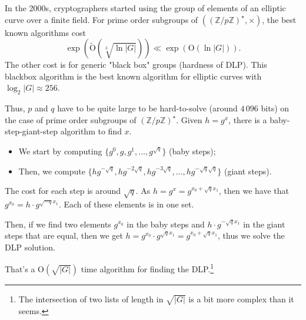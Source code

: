 \documentclass[./main]{subfiles}
\begin{document}
  In the 2000s, cryptographers started using the group of elements of an elliptic curve over a finite field.
  For prime order subgroups of $((\mathds{Z} / p \mathds{Z})^\star, \times )$, the best known algorithms cost 
  \[
    \exp(\tilde{\mathrm{O}}(\sqrt[3]{\ln |G|} )) \ll \exp(\mathrm{O}(\ln |G|))
  .\]
  The other cost is for generic "black box" groups (hardness of DLP).
  This blackbox algorithm is the best known algorithm for elliptic curves with $\log_2 |G| \approx 256$.

  Thus, $p$ and $q$ have to be quite large to be hard-to-solve (around $4\,096$ bits) on the case of prime order subgroups of $(\mathds{Z} / p \mathds{Z})^\star$.
  Given $h = g^x$, there is a baby-step-giant-step algorithm to find $x$.
  \begin{itemize}
    \item We start by computing $\{g^0, g, g^1, \ldots, g^{\sqrt{q}}\} $ (baby steps);
    \item Then, we compute $\{h g^{-\sqrt{q}},  hg^{-2\sqrt{q}}, hg^{-3\sqrt{q}}, \ldots, hg^{-\sqrt{q} \sqrt{q} }\} $ (giant steps).
  \end{itemize}
  The cost for each step is around $\sqrt{q}$.
  As $h = g^x = g^{x_0 + \sqrt{q} x_1}$, then we have that $g^{x_0} = h \cdot g^{\sqrt{-q} x_1}$.
  Each of these elements is in one set.

  Then, if we find two elements $g^{x_0}$ in the baby steps and $h \cdot g^{-\sqrt{q} x_1}$ in the giant steps that are equal, then we get $h = g^{x_0} \cdot g^{\sqrt{q} x_1} = g^{x_0 + \sqrt{q} x_1}$, thus we solve the DLP solution.

  That's a $\mathrm{O}(\sqrt{|G|})$ time algorithm for finding the DLP.\footnote{The intersection of two lists of length in $\sqrt{|G|}$ is a bit more complex than it seems.}
\end{document}
